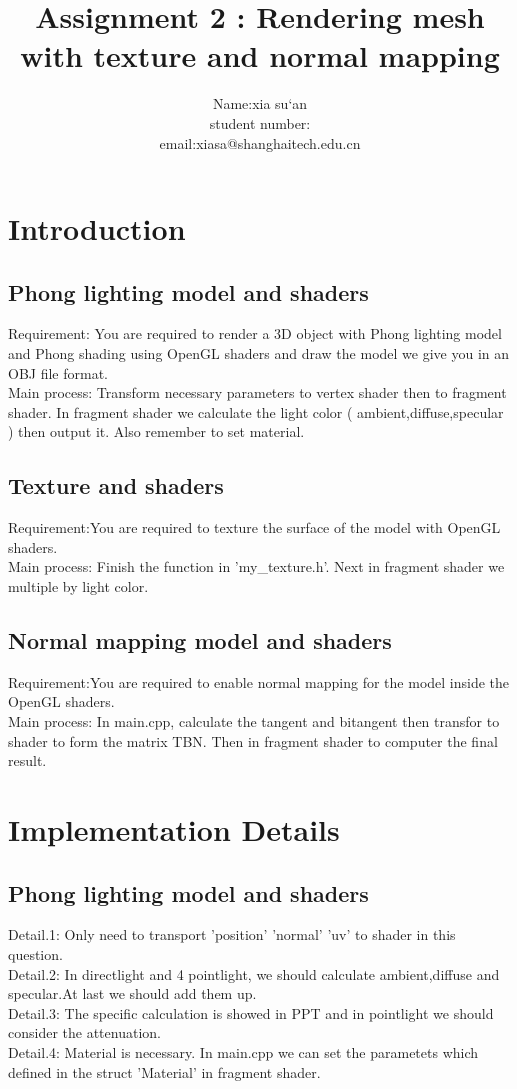 \documentclass[acmtog]{acmart}
\title{Assignment 2 : Rendering mesh with texture and normal mapping}
\author{Name:\quad xia su‘an  \\ student number:\quad 18047482
	\\email:\quad xiasa@shanghaitech.edu.cn}
\begin{document}
\maketitle

\vspace*{2 ex}


\section{Introduction}
\subsection{Phong lighting model and shaders}
Requirement: You are required to render a 3D object with Phong lighting model and Phong shading using OpenGL shaders and draw the model we give you in an OBJ file format.
\\Main process: Transform necessary parameters to vertex shader then to fragment shader. In fragment shader we calculate the light color ( ambient,diffuse,specular ) then output it. Also remember to set material.

\vspace*{1 ex}

\subsection{Texture and shaders}
Requirement:You are required to texture the surface of the model with OpenGL shaders.
\\Main process: Finish the function in 'my\_texture.h'. Next in fragment shader we multiple by light color.

\vspace*{1 ex}
\subsection{Normal mapping model and shaders}
Requirement:You are required to enable normal mapping for the model inside the OpenGL shaders.
\\Main process: In main.cpp, calculate the tangent and bitangent then transfor to shader to form the matrix TBN. Then in fragment shader to computer the final result.

\vspace*{2 ex}
\section{Implementation Details}
\subsection{Phong lighting model and shaders}
Detail.1: Only need to transport 'position' 'normal' 'uv' to shader in this question.
\\Detail.2: In directlight and 4 pointlight, we should calculate ambient,diffuse and specular.At last we should add them up.
\\Detail.3: The specific calculation is showed in PPT and in pointlight we should consider the attenuation.
\\Detail.4: Material is necessary. In main.cpp we can set the parametets which defined in the struct 'Material' in fragment shader.
\end{document}
